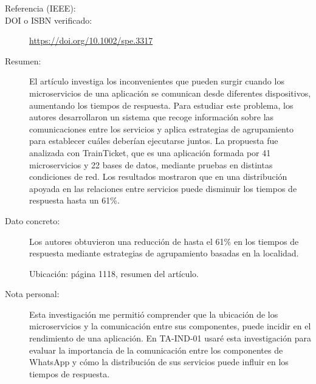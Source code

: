 \begin{description}

\item[Referencia (IEEE):]

\item[DOI o ISBN verificado:]
\url{https://doi.org/10.1002/spe.3317}

\item[Resumen:]
El artículo investiga los inconvenientes que pueden surgir cuando los microservicios de una aplicación se comunican desde diferentes dispositivos, aumentando los tiempos de respuesta. Para estudiar este problema, los autores desarrollaron un sistema que recoge información sobre las comunicaciones entre los servicios y aplica estrategias de agrupamiento para establecer cuáles deberían ejecutarse juntos. La propuesta fue analizada con TrainTicket, que es una aplicación formada por 41 microservicios y 22 bases de datos, mediante pruebas en distintas condiciones de red. Los resultados mostraron que en una distribución apoyada en las relaciones entre servicios puede disminuir los tiempos de respuesta hasta un 61\%.

\item[Dato concreto:]
Los autores obtuvieron una reducción de hasta el 61\% en los tiempos de respuesta mediante estrategias de agrupamiento basadas en la localidad.

Ubicación: página 1118, resumen del artículo.

\item[Nota personal:]
Esta investigación me permitió comprender que la ubicación de los microservicios y la comunicación entre sus componentes, puede incidir en el rendimiento de una aplicación. En TA-IND-01 usaré esta investigación para evaluar la importancia de la comunicación entre los componentes de WhatsApp y cómo la distribución de sus servicios puede influir en los tiempos de respuesta.

\end{description}

